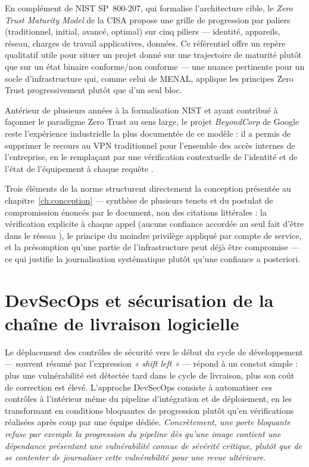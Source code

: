 En complément de NIST SP~800-207, qui formalise l'architecture cible, le \emph{Zero Trust
Maturity Model} de la CISA \parencite{cisa_zt_maturity_model} propose une grille de progression
par paliers (traditionnel, initial, avancé, optimal) sur cinq piliers --- identité, appareils,
réseau, charges de travail applicatives, données. Ce référentiel offre un repère qualitatif
utile pour situer un projet donné sur une trajectoire de maturité plutôt que sur un état binaire
conforme/non conforme --- une nuance pertinente pour un socle d'infrastructure qui, comme celui
de MENAL, applique les principes Zero Trust progressivement plutôt que d'un seul bloc.

Antérieur de plusieurs années à la formalisation NIST et ayant contribué à façonner le
paradigme Zero Trust au sens large, le projet \emph{BeyondCorp} de Google reste l'expérience
industrielle la plus documentée de ce modèle : il a permis de supprimer le recours au VPN
traditionnel pour l'ensemble des accès internes de l'entreprise, en le remplaçant par une
vérification contextuelle de l'identité et de l'état de l'équipement à chaque requête
\parencite{beyondcorp2014}.

\begin{keybox}[title=Ce que MENAL retient du NIST SP 800-207]
Trois éléments de la norme structurent directement la conception présentée au
chapitre~\ref{ch:conception} --- synthèse de plusieurs tenets et du postulat de compromission
énoncés par le document, non des citations littérales : la vérification explicite à chaque
appel (aucune confiance accordée au seul fait d'être \og dans le réseau \fg{}), le principe du
moindre privilège appliqué par compte de service, et la présomption qu'une partie de
l'infrastructure peut déjà être compromise --- ce qui justifie la journalisation systématique
plutôt qu'une confiance a posteriori.
\end{keybox}

\section{DevSecOps et sécurisation de la chaîne de livraison logicielle}

Le déplacement des contrôles de sécurité vers le début du cycle de développement --- souvent
résumé par l'expression \emph{« shift left »} \parencite{shiftleft_smith2001} --- répond à un
constat simple : plus une vulnérabilité est détectée tard dans le cycle de livraison, plus son
coût de correction est élevé. L'approche DevSecOps consiste à automatiser ces contrôles à
l'intérieur même du pipeline d'intégration et de déploiement, en les transformant en
conditions bloquantes de progression plutôt qu'en vérifications réalisées après coup par une
équipe dédiée. \textit{Concrètement, une porte bloquante refuse par exemple la progression du
pipeline dès qu'une image contient une dépendance présentant une vulnérabilité connue de
sévérité critique, plutôt que de se contenter de journaliser cette vulnérabilité pour une revue
ultérieure.}

